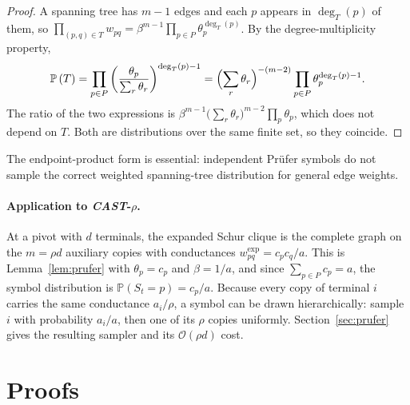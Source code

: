 \documentclass{article}
\newcommand{\CAST}{\textit{CAST}\xspace}
\newcommand{\calO}{\mathcal{O}}
\newcommand{\bigO}{\calO}
\newcommand{\1}{\mathbbm{1}}
\theoremstyle{plain}
\renewcommand{\Pr}[1]{\mathbb{P}\left(#1\right)}
\begin{document}
\begin{proof}
A spanning tree has $m-1$ edges and each $p$ appears in $\deg_T(p)$ of
them, so
$\prod_{(p,q)\in T}w_{pq}
 =\beta^{m-1}\prod_{p\in P}\theta_p^{\deg_T(p)}$.
By the degree-multiplicity property,
\[
\Pr{T}=\prod_{p\in P}
\left(\frac{\theta_p}{\sum_{r}\theta_r}\right)^{\deg_T(p)-1}
=\Bigl(\sum_{r}\theta_r\Bigr)^{-(m-2)}
\prod_{p\in P}\theta_p^{\deg_T(p)-1}.
\]
The ratio of the two expressions is
$\beta^{m-1}\bigl(\sum_r\theta_r\bigr)^{m-2}\prod_{p}\theta_p$, which
does not depend on $T$. Both are distributions over the same finite
set, so they coincide.
\end{proof}

The endpoint-product form is essential: independent Pr\"ufer symbols
do not sample the correct weighted spanning-tree distribution for
general edge weights.

\paragraph{Application to \CAST-$\rho$.}
At a pivot with $d$ terminals, the expanded Schur clique is the
complete graph on the $m=\rho d$ auxiliary copies with conductances
$w^{\mathrm{exp}}_{pq}=c_pc_q/a$. This is
Lemma~\ref{lem:prufer} with $\theta_p=c_p$ and $\beta=1/a$, and since
$\sum_{p\in P}c_p=a$, the symbol distribution is
$\Pr{S_t=p}=c_p/a$. Because every copy of terminal $i$ carries the
same conductance $a_i/\rho$, a symbol can be drawn hierarchically:
sample $i$ with probability $a_i/a$, then one of its $\rho$ copies
uniformly. Section~\ref{sec:prufer} gives the resulting sampler and
its $\bigO(\rho d)$ cost.




\section{Proofs}
\end{document}
